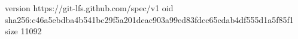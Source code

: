 version https://git-lfs.github.com/spec/v1
oid sha256:c46a5ebdba4b541bc29f5a201deac903a99ed83fdcc65cdab4df555d1a5f85f1
size 11092
